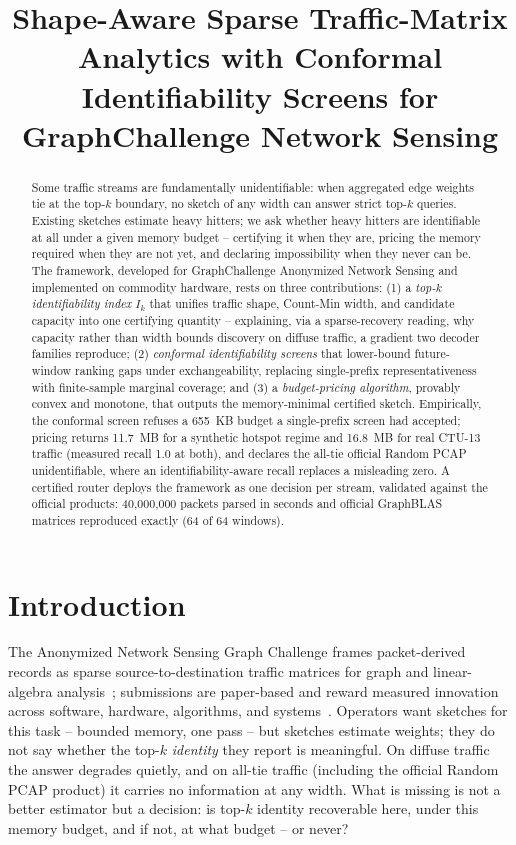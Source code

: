 \documentclass[conference]{IEEEtran}
\title{Shape-Aware Sparse Traffic-Matrix Analytics with Conformal Identifiability Screens for GraphChallenge Network Sensing}
\author{
\IEEEauthorblockN{Qifan Chen}
\IEEEauthorblockA{University of California, Santa Barbara\\
qifan\_chen@ucsb.edu}
}
\begin{document}
\maketitle

\begin{abstract}
Some traffic streams are fundamentally unidentifiable: when aggregated edge weights tie at the top-$k$ boundary, no sketch of any width can answer strict top-$k$ queries. Existing sketches estimate heavy hitters; we ask whether heavy hitters are identifiable at all under a given memory budget -- certifying it when they are, pricing the memory required when they are not yet, and declaring impossibility when they never can be. The framework, developed for GraphChallenge Anonymized Network Sensing and implemented on commodity hardware, rests on three contributions: (1) a \emph{top-$k$ identifiability index} $I_k$ that unifies traffic shape, Count-Min width, and candidate capacity into one certifying quantity -- explaining, via a sparse-recovery reading, why capacity rather than width bounds discovery on diffuse traffic, a gradient two decoder families reproduce; (2) \emph{conformal identifiability screens} that lower-bound future-window ranking gaps under exchangeability, replacing single-prefix representativeness with finite-sample marginal coverage; and (3) a \emph{budget-pricing algorithm}, provably convex and monotone, that outputs the memory-minimal certified sketch. Empirically, the conformal screen refuses a 655~KB budget a single-prefix screen had accepted; pricing returns 11.7~MB for a synthetic hotspot regime and 16.8~MB for real CTU-13 traffic (measured recall 1.0 at both), and declares the all-tie official Random PCAP unidentifiable, where an identifiability-aware recall replaces a misleading zero. A certified router deploys the framework as one decision per stream, validated against the official products: 40{,}000{,}000 packets parsed in seconds and official GraphBLAS matrices reproduced exactly (64 of 64 windows).
\end{abstract}

\section{Introduction}
The Anonymized Network Sensing Graph Challenge frames packet-derived records as sparse source-to-destination traffic matrices for graph and linear-algebra analysis~\cite{anonymizedNetworkSensing2024}; submissions are paper-based and reward measured innovation across software, hardware, algorithms, and systems~\cite{graphchallenge2026,graphchallengeSubmit2026}. Operators want sketches for this task -- bounded memory, one pass -- but sketches estimate weights; they do not say whether the top-$k$ \emph{identity} they report is meaningful. On diffuse traffic the answer degrades quietly, and on all-tie traffic (including the official Random PCAP product) it carries no information at any width. What is missing is not a better estimator but a decision: is top-$k$ identity recoverable here, under this memory budget, and if not, at what budget -- or never?
\end{document}
